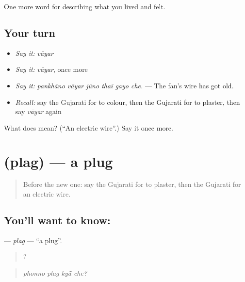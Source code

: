 \begin{grammarlens}[title={What you've built}]
One more word for describing what you lived and felt.
\end{grammarlens}

\subsection*{Your turn}
\begin{itemize}
\raggedright
  \item \emph{Say it:} \emph{vāyar}
  \item \emph{Say it:} \emph{vāyar}, once more
  \item \emph{Say it:} \emph{pankhāno vāyar jūno thaī gayo che.} — The fan's wire has got old.
  \item \emph{Recall:} say the Gujarati for to colour, then the Gujarati for to plaster, then say \emph{vāyar} again
\end{itemize}

\begin{tcolorbox}[breakable,colback=teal!4,colframe=teal!35!black,title={Before you move on}]
What does  mean? (\textquotedblleft{}An electric wire\textquotedblright{}.) Say it once more.
\end{tcolorbox}
\section[\texorpdfstring{\gu{પ્લગ} (plag)}{પ્લગ (plag)}]{ (plag) — a plug}

\label{lesson:GU-C517-plag}



\begin{quote}
Before the new one: say the Gujarati for to plaster, then the Gujarati for an electric wire.
\end{quote}

\subsection*{You'll want to know: }
\textbf{} — \emph{plag} — \textquotedblleft{}a plug\textquotedblright{}.

\begin{quote}
   ?
\end{quote}

\begin{quote}
\emph{phonno plag kyā̃ che?}
\end{quote}

